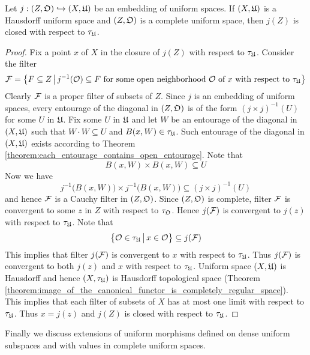 \begin{theorem}\label{theorem:embeddings_of_complete_space_into_Hausdorff_space_are_closed}
Let $j:\left(Z,{\mathfrak O} \right) \hookrightarrow \left(X,{\mathfrak U}\right)$ be an embedding of uniform spaces. If $\left(X,{\mathfrak U}\right)$ is a Hausdorff uniform space and $\left(Z,{\mathfrak O}\right)$ is a complete uniform space, then $j(Z)$ is closed with respect to $\tau_{{\mathfrak U}}$.
\end{theorem}
\begin{proof}
Fix a point $x$ of $X$ in the closure of $j(Z)$ with respect to $\tau_{{\mathfrak U}}$. Consider the filter
$${\mathcal F} = \big\{F\subseteq Z\,\big|\,j^{-1}({\mathcal O})\subseteq F\mbox{ for some open neighborhood }{\mathcal O}\mbox{ of }x\mbox{ with respect to }\tau_{{\mathfrak U}}\big\}$$
Clearly ${\mathcal F}$ is a proper filter of subsets of $Z$. Since $j$ is an embedding of uniform spaces, every entourage of the diagonal in $(Z,{\mathfrak O})$ is of the form $\left(j\times j\right)^{-1}(U)$ for some $U$ in ${\mathfrak U}$. Fix some $U$ in ${\mathfrak U}$ and let $W$ be an entourage of the diagonal in $(X,{\mathfrak U})$ such that $W\cdot W\subseteq U$ and $B(x,W) \in \tau_{{\mathfrak U}}$. Such entourage of the diagonal in $(X,{\mathfrak U})$ exists according to Theorem \ref{theorem:each_entourage_contains_open_entourage}. Note that
$$B(x,W) \times B(x,W) \subseteq U$$
Now we have 
$$j^{-1}\big(B(x,W)\big)\times j^{-1}\big(B(x,W)\big) \subseteq \left(j\times j\right)^{-1}(U)$$
and hence ${\mathcal F}$ is a Cauchy filter in $\left(Z,{\mathfrak O}\right)$. Since $(Z,{\mathfrak O})$ is complete, filter ${\mathcal F}$ is convergent to some $z$ in $Z$ with respect to $\tau_{{\mathfrak O}}$. Hence $j({\mathcal F})$ is convergent to $j(z)$ with respect to $\tau_{{\mathfrak U}}$. Note that
$$\big\{{\mathcal O} \in \tau_{{\mathfrak U}}\,\big|\,x\in {\mathcal O} \big\} \subseteq j({\mathcal F})$$
This implies that filter $j({\mathcal F})$ is convergent to $x$ with respect to $\tau_{{\mathfrak U}}$. Thus $j({\mathcal F})$ is convergent to both $j(z)$ and $x$ with respect to $\tau_{{\mathfrak U}}$. Uniform space $(X,{\mathfrak U})$ is Hausdorff and hence $(X,\tau_{{\mathfrak U}})$ is Hausdorff topological space (Theorem \ref{theorem:image_of_the_canonical_functor_is_completely_regular_space}). This implies that each filter of subsets of $X$ has at most one limit with respect to $\tau_{{\mathfrak U}}$. Thus $x = j(z)$ and $j(Z)$ is closed with respect to $\tau_{{\mathfrak U}}$.
\end{proof}
\noindent
Finally we discuss extensions of uniform morphisms defined on dense uniform subspaces and with values in complete uniform spaces.

